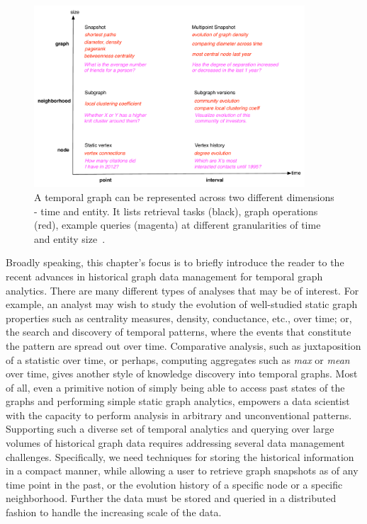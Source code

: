 \documentclass[graybox, natbib, nosecnum, twocolumn]{svmult}
\begin{document}
\begin{figure}
\centering
\includegraphics [width=0.9\textwidth]{entity-time.pdf}
\caption{A temporal graph can be represented across two different dimensions - time
and entity. It lists retrieval tasks (black), graph operations (red), example queries
(magenta) at different granularities of time and entity size~\cite{khurana2015historical}.}
\label{fig:et}
\end{figure}





Broadly speaking, this chapter's focus is to briefly introduce the reader to the recent advances in historical graph data management for temporal graph analytics. 
There are many different types of analyses that may be of interest. 
For example, an analyst may wish to study the evolution of well-studied static graph properties such
as centrality measures, density, conductance, etc., over time; or, the search and 
discovery of temporal patterns, where the events that constitute the pattern are spread out over time. 
Comparative analysis, such as juxtaposition of a statistic over time, or perhaps, computing 
aggregates such as \textit{max} or \textit{mean} over time, gives another style of knowledge discovery 
into temporal graphs. Most of all, even a primitive notion of simply being able to access past states of the graphs 
and performing simple static graph analytics, empowers a data scientist with the capacity to 
perform analysis in arbitrary and unconventional patterns. 
Supporting such a diverse set of temporal analytics and querying over large volumes of historical graph data 
requires addressing several data management challenges. Specifically, we need techniques for storing
the historical information in a compact manner, while allowing a user to retrieve graph snapshots as of any
time point in the past, or the evolution history of a specific node or a specific neighborhood. Further the
data must be stored and queried in a distributed fashion to handle the increasing scale of the data. 
\end{document}
